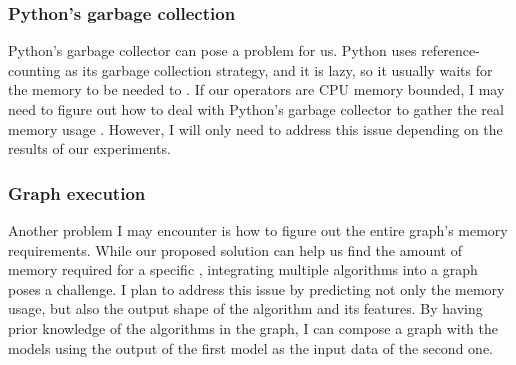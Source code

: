 \subsubsection{Python's garbage collection}

Python's garbage collector can pose a problem for us.
Python uses reference-counting as its garbage collection strategy, and it is lazy, so it usually waits for the memory to be needed to .
If our operators are \ac{CPU} memory bounded, I may need to figure out how to deal with Python's garbage collector to gather the real memory usage .
However, I will only need to address this issue depending on the results of our experiments.

\subsubsection{Graph execution}

Another problem I may encounter is how to figure out the entire graph's memory requirements.
While our proposed solution can help us find the amount of memory required for a specific , integrating multiple algorithms into a graph poses a challenge.
I plan to address this issue by predicting not only the memory usage, but also the output shape of the algorithm and its features.
By having prior knowledge of the algorithms in the graph, I can compose a graph with the models using the output of the first model as the input data of the second one.
